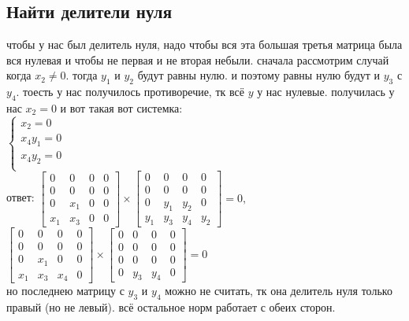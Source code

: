 \documentclass{article}
\newcommand{\ds}{\displaystyle}
\begin{document}
  \subsection{Найти делители нуля}
  чтобы у нас был делитель нуля, надо чтобы вся эта большая третья матрица была вся нулевая и чтобы не первая и не вторая небыли.
  сначала рассмотрим случай когда $x_2 \neq 0$.
  тогда $y_1$ и $y_2$ будут равны нулю. и поэтому равны нулю будут и $y_3$ с $y_4$.
  тоесть у нас получилось противоречие, тк всё $y$ у нас нулевые.
  получилась у нас $x_2 = 0$ и вот такая вот системка: \\
  $\ds \begin{cases}
    x_2 = 0 \\
    x_4y_1 = 0 \\
    x_4y_2 = 0 \\
  \end{cases}$ \\
  ответ:
  $\ds \begin{bmatrix}
    0 & 0 & 0 & 0\\0 & 0 & 0 & 0\\0 & x_1 & 0 & 0\\x_1 & x_3 & 0 & 0
  \end{bmatrix} \times \begin{bmatrix}
    0 & 0 & 0 & 0\\0 & 0 & 0 & 0\\0 & y_1 & y_2 & 0\\y_1 & y_3 & y_4 & y_2
  \end{bmatrix} = 0,\qquad$
  $\ds \begin{bmatrix}
    0 & 0 & 0 & 0\\0 & 0 & 0 & 0\\0 & x_1 & 0 & 0\\x_1 & x_3 & x_4 & 0
  \end{bmatrix} \times \begin{bmatrix}
    0 & 0 & 0 & 0\\0 & 0 & 0 & 0\\0 & 0 & 0 & 0\\0 & y_3 & y_4 & 0
  \end{bmatrix} = 0$ \\
  но последнею матрицу с $y_3$ и $y_4$ можно не считать, тк она делитель нуля только правый (но не левый).
  всё остальное норм работает с обеих сторон.
\end{document}
